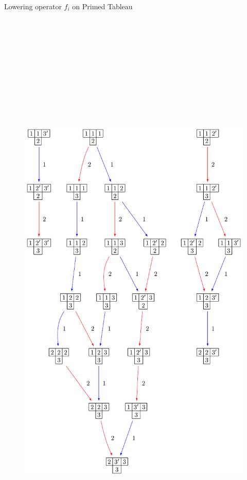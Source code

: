 \documentclass[final]{beamer}
\theoremstyle{definition}
\numberwithin{equation}{section}
\newlength{\onecolwid}
\begin{document}
\begin{frame}[t]
\begin{columns}[t]
\begin{column}{\onecolwid}
\begin{block}{Lowering operator $f_i$ on Primed Tableau}
\begin{itemize}
\begin{figure}[h]
\includegraphics[width=25cm, height=40cm]{Crystal}
\centering
\end{figure}


\end{itemize}
\end{block}
\end{column}
\end{columns}
\end{frame}
\end{document}
